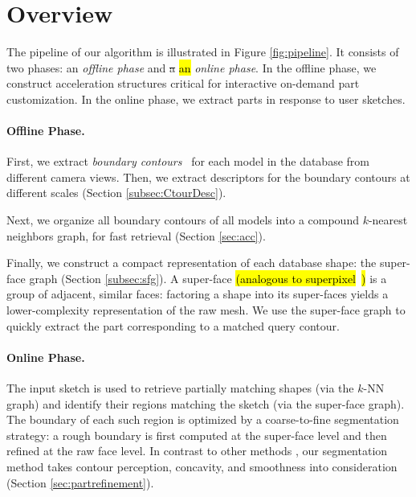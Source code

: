 \section{Overview}

The pipeline of our algorithm is illustrated in Figure \ref{fig:pipeline}. It consists of two phases: an \emph{offline phase} and \st{a} \hl{an} \emph{online phase}. In the offline phase, we construct acceleration structures critical for interactive on-demand part customization. In the online phase, we extract parts in response to user sketches.

\paragraph*{Offline Phase.}
First, we extract {\em boundary contours}~\cite{suggestivecontoursrusinkiewicztog2003} for each model in the database from different camera views. Then, we extract descriptors for the boundary contours at different scales (Section \ref{subsec:CtourDesc}).

Next, we organize all boundary contours of all models into a compound $k$-nearest neighbors graph, for fast retrieval (Section \ref{sec:acc}).

Finally, we construct a compact representation of each database shape: the super-face graph (Section \ref{subsec:sfg}). A super-face \hl{(analogous to superpixel}~\cite{RenLCM2003}\hl{)} is a group of adjacent, similar faces: factoring a shape into its super-faces yields a lower-complexity representation of the raw mesh. We use the super-face graph to quickly extract the part corresponding to a matched query contour.

\paragraph*{Online Phase.}
The input sketch is used to retrieve partially matching shapes (via the $k$-NN graph) and identify their regions matching the sketch (via the super-face graph). The boundary of each such region is optimized by a coarse-to-fine segmentation strategy: a rough boundary is first computed at the super-face level and then refined at the raw face level. In contrast to other methods \cite{surveyonmeshsegmentationshamircgf2008}, our segmentation method takes contour perception, concavity, and smoothness into consideration (Section \ref{sec:partrefinement}).
